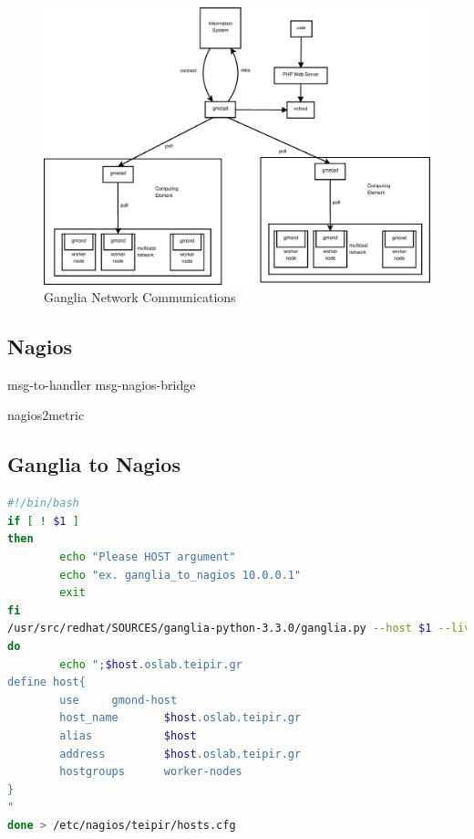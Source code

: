 \begin{figure}[htb]
\centering
 \includegraphics[width=6in]{images/ganglia_data_flow.eps}
\caption{Ganglia Network Communications}
\label{figure:ganglia_network}
\end{figure}



\subsection{Nagios}
msg-to-handler msg-nagios-bridge

nagios2metric

\subsection{Ganglia to Nagios}

\begin{lstlisting}[language=bash,caption=Ganglia to Nagios script]
#!/bin/bash
if [ ! $1 ]
then
        echo "Please HOST argument"
        echo "ex. ganglia_to_nagios 10.0.0.1"
        exit
fi
/usr/src/redhat/SOURCES/ganglia-python-3.3.0/ganglia.py --host $1 --live | while read host
do
        echo ";$host.oslab.teipir.gr
define host{
        use     gmond-host
        host_name       $host.oslab.teipir.gr
        alias           $host
        address         $host.oslab.teipir.gr
        hostgroups      worker-nodes
}
"
done > /etc/nagios/teipir/hosts.cfg
\end{lstlisting}

